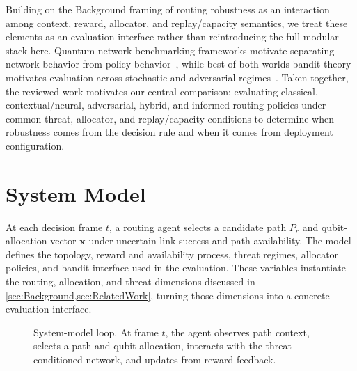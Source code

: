 \documentclass[10pt,conference]{IEEEtran}
\begin{document}
Building on the Background framing of routing robustness as an interaction among context, reward, allocator, and replay/capacity semantics, we treat these elements as an evaluation interface rather than reintroducing the full modular stack here. Quantum-network benchmarking frameworks motivate separating network behavior from policy behavior~\cite{coopmans2021benchmark,kozlowski2022utility}, while best-of-both-worlds bandit theory motivates evaluation across stochastic and adversarial regimes~\cite{zimmert2019optimal}. Taken together, the reviewed work motivates our central comparison: evaluating classical, contextual/neural, adversarial, hybrid, and informed routing policies under common threat, allocator, and replay/capacity conditions to determine when robustness comes from the decision rule and when it comes from deployment configuration.

\section{System Model}
\label{sec:SystemModel}

At each decision frame $t$, a routing agent selects a candidate path $P_r$ and qubit-allocation vector $\mathbf{x}$ under uncertain link success and path availability. The model defines the topology, reward and availability process, threat regimes, allocator policies, and bandit interface used in the evaluation. These variables instantiate the routing, allocation, and threat dimensions discussed in \cref{sec:Background,sec:RelatedWork}, turning those dimensions into a concrete evaluation interface.

\begin{figure}[t]
\centering
\footnotesize
{}
\caption{System-model loop. At frame $t$, the agent observes path context, selects a path and qubit allocation, interacts with the threat-conditioned network, and updates from reward feedback.}
\label{fig:system_model}
\end{figure}
\end{document}
